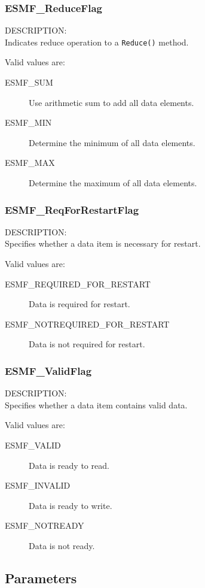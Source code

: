 \subsubsection{ESMF\_ReduceFlag}
\label{opt:reduceflag}
{\sf DESCRIPTION:\\}
Indicates reduce operation to a {\tt Reduce()} method.

Valid values are:
\begin{description}
   \item [ESMF\_SUM]
         Use arithmetic sum to add all data elements.
   \item [ESMF\_MIN]
         Determine the minimum of all data elements.
   \item [ESMF\_MAX]
         Determine the maximum of all data elements.
\end{description}

\subsubsection{ESMF\_ReqForRestartFlag}
\label{opt:reqforrestartflag}
{\sf DESCRIPTION:\\}
Specifies whether a data item is necessary for restart.

Valid values are:
\begin{description}
   \item [ESMF\_REQUIRED\_FOR\_RESTART] 
         Data is required for restart.
   \item [ESMF\_NOTREQUIRED\_FOR\_RESTART]
         Data is not required for restart.
\end{description}

\subsubsection{ESMF\_ValidFlag}
\label{opt:validflag}
{\sf DESCRIPTION:\\}
Specifies whether a data item contains valid data.

Valid values are:
\begin{description}
   \item [ESMF\_VALID] 
         Data is ready to read.
   \item [ESMF\_INVALID]
         Data is ready to write.
   \item [ESMF\_NOTREADY]
         Data is not ready.
\end{description}


\subsection{Parameters}

